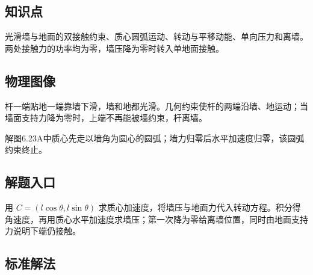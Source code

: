 \documentclass[UTF8,fontset=fandol,a4paper,11pt]{ctexart}
\begin{document}


\subsection*{知识点}

光滑墙与地面的双接触约束、质心圆弧运动、转动与平移动能、单向压力和离墙。两处接触力的功率均为零，墙压降为零时转入单地面接触。




\subsection*{物理图像}

杆一端贴地一端靠墙下滑，墙和地都光滑。几何约束使杆的两端沿墙、地运动；当墙面支持力降为零时，上端不再能被墙约束，杆离墙。

解图6.23A中质心先走以墙角为圆心的圆弧；墙力归零后水平加速度归零，该圆弧约束终止。



\subsection*{解题入口}

用 $C=(l\cos\theta,l\sin\theta)$ 求质心加速度，将墙压与地面力代入转动方程。积分得角速度，再用质心水平加速度求墙压；第一次降为零给离墙位置，同时由地面支持力说明下端仍接触。



\subsection*{标准解法}
\end{document}
